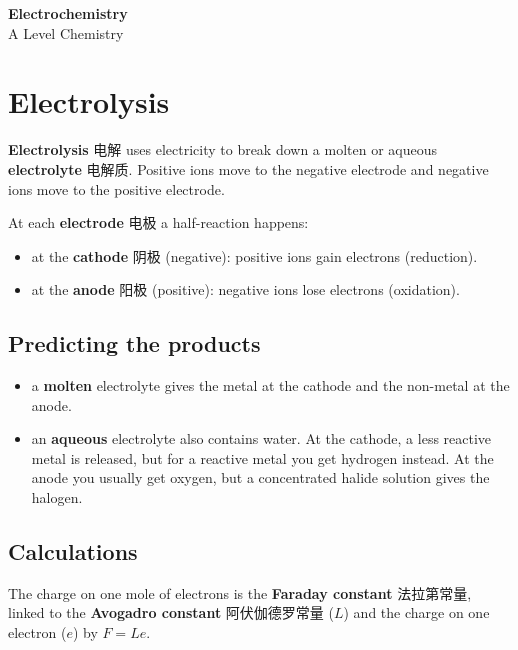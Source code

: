 \documentclass[11pt]{article}
\begin{document}
\begin{center}
  {\LARGE\bfseries Electrochemistry}\\[0.35em]
  {\large A Level Chemistry}
\end{center}
\vspace{0.6em}

\section*{Electrolysis}

\textbf{Electrolysis} 电解 uses electricity to break down a molten or aqueous \textbf{electrolyte} 电解质. Positive ions move to the negative electrode and negative ions move to the positive electrode.

At each \textbf{electrode} 电极 a half-reaction happens:

\begin{itemize}
\item at the \textbf{cathode} 阴极 (negative): positive ions gain electrons (reduction).

\item at the \textbf{anode} 阳极 (positive): negative ions lose electrons (oxidation).

\end{itemize}

\subsection*{Predicting the products}

\begin{itemize}
\item a \textbf{molten} electrolyte gives the metal at the cathode and the non-metal at the anode.

\item an \textbf{aqueous} electrolyte also contains water. At the cathode, a less reactive metal is released, but for a reactive metal you get hydrogen instead. At the anode you usually get oxygen, but a concentrated halide solution gives the halogen.

\end{itemize}

\subsection*{Calculations}

The charge on one mole of electrons is the \textbf{Faraday constant} 法拉第常量, linked to the \textbf{Avogadro constant} 阿伏伽德罗常量 ($L$) and the charge on one electron ($e$) by $F = Le$.
\end{document}
